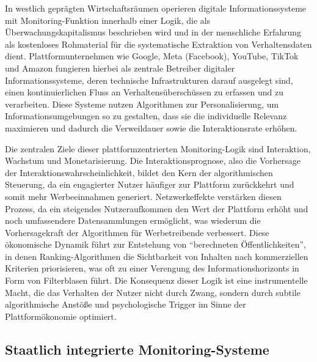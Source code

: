 In westlich geprägten Wirtschaftsräumen operieren digitale Informationssysteme mit Monitoring-Funktion innerhalb einer Logik, die als Überwachungskapitalismus beschrieben wird und in der menschliche Erfahrung als kostenloses Rohmaterial für die systematische Extraktion von Verhaltensdaten dient. Plattformunternehmen wie Google, Meta (Facebook), YouTube, TikTok und Amazon fungieren hierbei als zentrale Betreiber digitaler Informationssysteme, deren technische Infrastrukturen darauf ausgelegt sind, einen kontinuierlichen Fluss an Verhaltensüberschüssen zu erfassen und zu verarbeiten. Diese Systeme nutzen Algorithmen zur Personalisierung, um Informationsumgebungen so zu gestalten, dass sie die individuelle Relevanz maximieren und dadurch die Verweildauer sowie die Interaktionsrate erhöhen.

Die zentralen Ziele dieser plattformzentrierten Monitoring-Logik sind Interaktion, Wachstum und Monetarisierung. Die Interaktionsprognose, also die Vorhersage der Interaktionswahrscheinlichkeit, bildet den Kern der algorithmischen Steuerung, da ein engagierter Nutzer häufiger zur Plattform zurückkehrt und somit mehr Werbeeinnahmen generiert. Netzwerkeffekte verstärken diesen Prozess, da ein steigendes Nutzeraufkommen den Wert der Plattform erhöht und noch umfassendere Datensammlungen ermöglicht, was wiederum die Vorhersagekraft der Algorithmen für Werbetreibende verbessert. Diese ökonomische Dynamik führt zur Entstehung von \enquote{berechneten Öffentlichkeiten}, in denen Ranking-Algorithmen die Sichtbarkeit von Inhalten nach kommerziellen Kriterien priorisieren, was oft zu einer Verengung des Informationshorizonts in Form von Filterblasen führt. Die Konsequenz dieser Logik ist eine instrumentelle Macht, die das Verhalten der Nutzer nicht durch Zwang, sondern durch subtile algorithmische Anstöße und psychologische Trigger im Sinne der Plattformökonomie optimiert.

\subsection{Staatlich integrierte Monitoring-Systeme}


